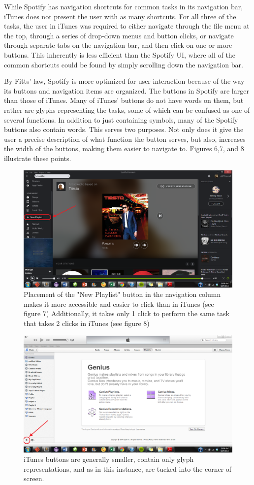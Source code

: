 \documentclass[12pt]{article}
\begin{document}
While Spotify has navigation shortcuts for common tasks in its 
navigation bar, iTunes does not present the user with as many 
shortcuts. For all three of the tasks, the user in iTunes was 
required to either navigate through the file menu at the top, 
through a series of drop-down menus and button clicks, or navigate 
through separate tabs on the navigation bar, and then click on one 
or more buttons. This inherently is less efficient than the 
Spotify UI, where all of the common shortcuts could be found by 
simply scrolling down the navigation bar. 

By Fitts' law, Spotify is more optimized for user interaction 
because of the way its buttons and navigation items are organized. 
The buttons in Spotify are larger than those of iTunes. Many of 
iTunes' buttons do not have words on them, but rather are glyphs 
representing the tasks, some of which can be confused as one of 
several functions. In addition to just containing symbols, many of 
the Spotify buttons also contain words. This serves two purposes. 
Not only does it give the user a precise description of what 
function the button serves, but also, increases the width of the 
buttons, making them easier to navigate to. Figures 6,7, and 8 
illustrate these points.

\begin{figure}[H]
	\centering
	\includegraphics[width=.75\textwidth]{chart8.png}
	\caption{Placement of the "New Playlist" button in the 
navigation column makes it more accessible and easier to click 
than in iTunes (see figure 7) Additionally, it takes only 1 click 
to perform the same task that takes 2 clicks in iTunes (see figure 
8)}
\end{figure}

\begin{figure}[H]
	\centering
	\includegraphics[width=.75\textwidth]{chart7.png}
	\caption{iTunes buttons are generally smaller, contain 
only glyph representations, and as in this instance, are tucked 
into the corner of screen.}
\end{figure}
\end{document}
